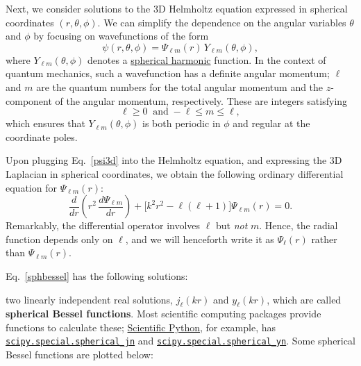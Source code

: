 \documentclass[pra,12pt]{revtex4}
\begin{document}
Next, we consider solutions to the 3D Helmholtz equation expressed in
spherical coordinates $(r, \theta, \phi)$.  We can simplify the
dependence on the angular variables $\theta$ and $\phi$ by focusing on
wavefunctions of the form
\begin{equation}
  \psi(r,\theta,\phi) = \Psi_{\ell m}(r) \,Y_{\ell m}(\theta, \phi),
  \label{psi3d}
\end{equation}
where $Y_{\ell m}(\theta,\phi)$ denotes a
\href{https://docs.scipy.org/doc/scipy/reference/generated/scipy.special.sph_harm.html}{spherical
  harmonic} function.  In the context of quantum mechanics, such a
wavefunction has a definite angular momentum; $\ell$ and $m$ are the
quantum numbers for the total angular momentum and the $z$-component
of the angular momentum, respectively.  These are integers satisfying
\begin{equation}
  \ell \ge 0 \;\;\mathrm{and}\; -\ell\le m \le \ell,
\end{equation}
which ensures that $Y_{\ell m}(\theta,\phi)$ is both periodic in
$\phi$ and regular at the coordinate poles.

Upon plugging Eq.~\eqref{psi3d} into the Helmholtz equation, and
expressing the 3D Laplacian in spherical coordinates, we obtain the
following ordinary differential equation for $\Psi_{\ell m}(r)$:
\begin{equation}
  \frac{d}{dr}\left(r^2 \, \frac{d\Psi_{\ell m}}{dr}\right)
  + \Big[k^2r^2 - \ell(\ell+1)\Big] \Psi_{\ell m}(r) = 0.
  \label{sphbessel}
\end{equation}
Remarkably, the differential operator involves $\ell$ but \textit{not}
$m$.  Hence, the radial function depends only on $\ell$, and we will
henceforth write it as $\Psi_\ell(r)$ rather than $\Psi_{\ell m}(r)$.

Eq.~\eqref{sphbessel} has the following solutions:



two linearly independent real solutions,
$j_\ell(kr)$ and $y_\ell(kr)$, which are called \textbf{spherical
  Bessel functions}.  Most scientific computing packages provide
functions to calculate these; \href{https://scipy.org/}{Scientific
  Python}, for example, has
\href{https://docs.scipy.org/doc/scipy/reference/generated/scipy.special.spherical_jn.html}{\texttt{scipy.special.spherical\_jn}}
and
\href{https://docs.scipy.org/doc/scipy/reference/generated/scipy.special.spherical_yn.html}{\texttt{scipy.special.spherical\_yn}}.
Some spherical Bessel functions are plotted below:
\end{document}
